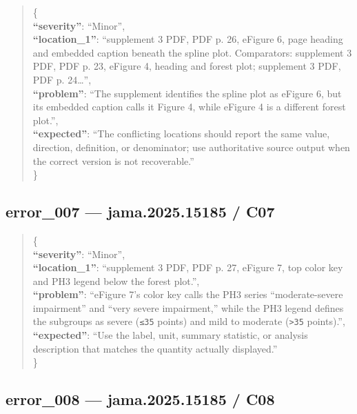 \documentclass[
  letterpaper,
  9pt]{extreport}
\begin{document}
\begin{quote}
\{\\
\textbf{``severity''}: ``Minor'',\\
\textbf{``location\_1''}: ``supplement 3 PDF, PDF p. 26, eFigure 6, page
heading and embedded caption beneath the spline plot. Comparators:
supplement 3 PDF, PDF p. 23, eFigure 4, heading and forest plot;
supplement 3 PDF, PDF p. 24\ldots{}'',\\
\textbf{``problem''}: ``The supplement identifies the spline plot as
eFigure 6, but its embedded caption calls it Figure 4, while eFigure 4
is a different forest plot.'',\\
\textbf{``expected''}: ``The conflicting locations should report the
same value, direction, definition, or denominator; use authoritative
source output when the correct version is not recoverable.''\\
\}
\end{quote}

\hypertarget{error_007--jama202515185--c07}{%
\subsection{error\_007 --- jama.2025.15185 /
C07}\label{error_007--jama202515185--c07}}

\begin{quote}
\{\\
\textbf{``severity''}: ``Minor'',\\
\textbf{``location\_1''}: ``supplement 3 PDF, PDF p. 27, eFigure 7, top
color key and PH3 legend below the forest plot.'',\\
\textbf{``problem''}: ``eFigure 7's color key calls the PH3 series
``moderate-severe impairment'' and ``very severe impairment,'' while the
PH3 legend defines the subgroups as severe (\texttt{≤35} points) and
mild to moderate (\texttt{\textgreater{}35} points).'',\\
\textbf{``expected''}: ``Use the label, unit, summary statistic, or
analysis description that matches the quantity actually displayed.''\\
\}
\end{quote}

\hypertarget{error_008--jama202515185--c08}{%
\subsection{error\_008 --- jama.2025.15185 /
C08}\label{error_008--jama202515185--c08}}
\end{document}
